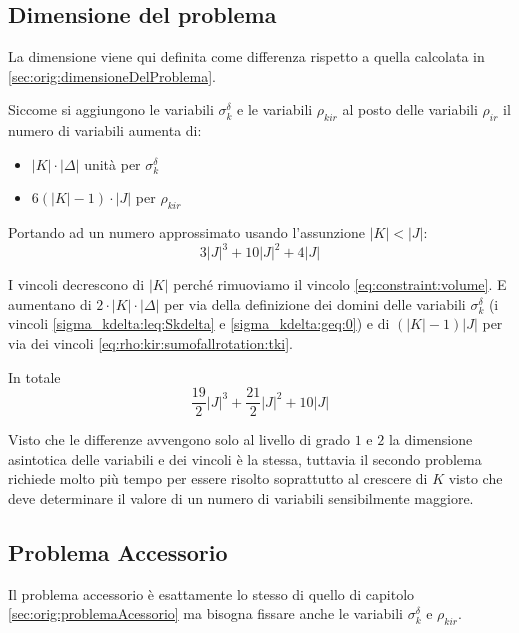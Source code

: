 \documentclass{scrartcl}
\begin{document}
\subsection{Dimensione del problema}

La dimensione viene qui definita come differenza rispetto a quella calcolata in \ref{sec:orig:dimensioneDelProblema}.

Siccome si aggiungono le variabili $\sigma_k^\delta$ e le variabili $\rho_{kir}$ al posto delle variabili $\rho_{ir}$ il numero di variabili aumenta di:
\begin{itemize}
	\item $|K|\cdot|\Delta|$ unità per $\sigma_k^\delta$
	
	\item $6(|K|-1)\cdot |J|$ per $\rho_{kir}$
\end{itemize} 

Portando ad un numero approssimato usando l'assunzione $|K| < |J|$:
$$
3|J|^3 + 10|J|^2 + 4|J| 
$$


I vincoli decrescono di $|K|$ perché rimuoviamo il vincolo \ref{eq:constraint:volume}. E aumentano di $2 \cdot |K|\cdot|\Delta|$ per via della definizione dei domini delle variabili $\sigma_k^\delta$ (i vincoli \ref{sigma_kdelta:leq:Skdelta} e \ref{sigma_kdelta:geq:0}) e di $(|K|-1) |J|$ per via dei vincoli \ref{eq:rho:kir:sumofallrotation:tki}.

In totale
$$
\frac{19}{2} |J|^3 + \frac{21}{2} |J|^2 + 10|J|
$$


Visto che le differenze avvengono solo al livello di grado $1$ e $2$ la dimensione asintotica delle variabili e dei vincoli è la stessa, tuttavia il secondo problema richiede molto più tempo per essere risolto soprattutto al crescere di $K$ visto che deve determinare il valore di un numero di variabili sensibilmente maggiore.


\subsection{Problema Accessorio}

Il problema accessorio è esattamente lo stesso di quello di capitolo \ref{sec:orig:problemaAcessorio} ma bisogna fissare anche le variabili $\sigma_k^\delta$ e $\rho_{kir}$.
\end{document}
